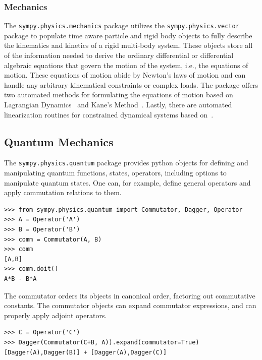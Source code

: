 \subsubsection{Mechanics}

The \verb|sympy.physics.mechanics| package utilizes the \texttt{sympy.\allowbreak{}physics.\allowbreak{}vector} package
to populate time aware particle and rigid body objects to fully describe the
kinematics and kinetics of a rigid multi-body system. These objects store all
of the information needed to derive the ordinary differential or differential
algebraic equations that govern the motion of the system, i.e., the equations
of motion. These equations of motion abide by Newton's laws of motion and can
handle any arbitrary kinematical constraints or complex loads. The package
offers two automated methods for formulating the equations of motion based on
Lagrangian Dynamics~\cite{Lagrange1811} and Kane's Method~\cite{Kane1985}. Lastly, there
are automated linearization routines for constrained dynamical
systems based on~\cite{Peterson2014}.

\subsection{Quantum Mechanics}

The \verb|sympy.physics.quantum| package provides python objects for defining and manipulating quantum functions, states, operators, including options to manipulate quantum states. One can, for example, define general operators and apply commutation relations to them.
\begin{verbatim}
>>> from sympy.physics.quantum import Commutator, Dagger, Operator
>>> A = Operator('A')
>>> B = Operator('B')
>>> comm = Commutator(A, B)
>>> comm
[A,B]
>>> comm.doit()
A*B - B*A

\end{verbatim}
The commutator orders its objects in canonical order, factoring out commutative constants. The commutator objects can expand commutator expressions, and can properly apply adjoint operators.
\begin{verbatim}
>>> C = Operator('C')
>>> Dagger(Commutator(C+B, A)).expand(commutator=True)
[Dagger(A),Dagger(B)] + [Dagger(A),Dagger(C)]

\end{verbatim}

